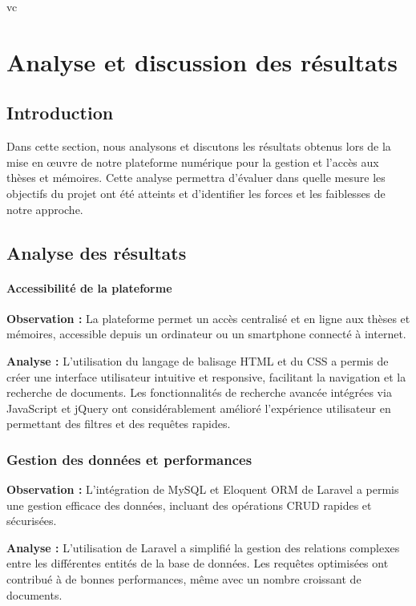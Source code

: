 vc\chapter{Analyse et discussion des résultats}
\begin{spacing}{1.2}
\minitoc
\thispagestyle{MyStyle}
\end{spacing}
\newpage

\section*{Introduction}
Dans cette section, nous analysons et discutons les résultats obtenus lors de la mise en œuvre de notre plateforme numérique pour la gestion et l'accès aux thèses et mémoires. Cette analyse permettra d'évaluer dans quelle mesure les objectifs du projet ont été atteints et d'identifier les forces et les faiblesses de notre approche.

\section{Analyse des résultats}
\subsubsection{Accessibilité de la plateforme}
\textbf{Observation :} La plateforme permet un accès centralisé et en ligne aux thèses et mémoires, accessible depuis un ordinateur ou un smartphone connecté à internet.\par

\textbf{Analyse :} L'utilisation du langage de balisage HTML et du CSS a permis de créer une interface utilisateur intuitive et responsive, facilitant la navigation et la recherche de documents. Les fonctionnalités de recherche avancée intégrées via JavaScript et jQuery ont considérablement amélioré l'expérience utilisateur en permettant des filtres et des requêtes rapides.

\subsection{Gestion des données et performances}
\textbf{Observation :} L'intégration de MySQL et Eloquent ORM de Laravel a permis une gestion efficace des données, incluant des opérations CRUD rapides et sécurisées.\par

\textbf{Analyse :} L'utilisation de Laravel a simplifié la gestion des relations complexes entre les différentes entités de la base de données. Les requêtes optimisées ont contribué à de bonnes performances, même avec un nombre croissant de documents.

